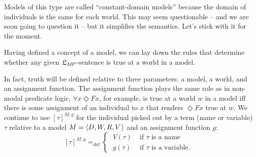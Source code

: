 Models of this type are called ``constant-domain models'' because the domain of
individuals is the same for each world. This may seem questionable -- and we are
soon going to question it -- but it simplifies the semantics. Let’s stick
with it for the moment.

Having defined a concept of a model, we can lay down the rules that determine
whether any given $\mathfrak{L}_{M\!P}$-sentence is true at a world in a model.

In fact, truth will be defined relative to three parameters: a model, a world,
and an assignment function. The assignment function plays the same role as in
non-modal predicate logic. $\forall x \Diamond Fx$, for example, is true at a
world $w$ in a model iff there is some assignment of an individual to $x$ that
renders $\Diamond Fx$ true at $w$. We continue to use $[\tau]^{M,g}$ for the
individual picked out by a term (name or variable) $\tau$ relative to a model
$M = \t{D,W,R,V}$ and an assignment function $g$:
\[
  [\tau]^{M,g} =_\text{def} \begin{cases} \;V(\tau) & \text{ if $\tau$ is a name}\\
    \;g(\tau) & \text{ if $\tau$ is a variable}.
  \end{cases}
\]


